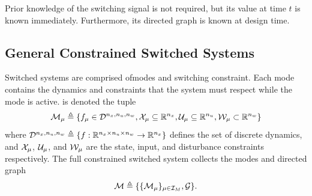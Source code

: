 Prior knowledge of the switching signal is not required, but its value at time $t$ is known immediately. Furthermore, its directed graph is known at design time. 
\subsection{General Constrained Switched Systems}
Switched systems  are comprised of\edit{}{\nummodes}modes and  switching constraint. Each mode contains the dynamics and constraints that the system must respect while the mode is active.  is denoted  the tuple
\begin{equation}
\mode{\modeidx}\triangleq\{f_\modeidx\in \mathcal{D}^{\nx,\nu,\nw}, \xcon[\modeidx]\subseteq\real^\nx, \ucon[\modeidx]\subseteq\real^\nu, \wcon[\modeidx]\subset\real^\nw\}\nonumber
\end{equation}
where $\mathcal{D}^{{n_x},{n_u},{n_w}}\triangleq\{f:\mathbb{R}^{{n_x}\times{n_u}\times{n_w}}\rightarrow\mathbb{R}^{{n_x}}\}$ defines the set of discrete dynamics,  and $\xcon[\modeidx]$, $\ucon[\modeidx]$, and  $\wcon[\modeidx]$ are the state, input, and disturbance constraints respectively. The full constrained switched system collects the modes and directed graph 
\begin{equation}\label{eq:basic_switched_sys}
\modes\triangleq\{\{\mode{\modeidx}\}_{\modeidx\in\idxset{\nummodes}}, \graph\}.
\end{equation}

